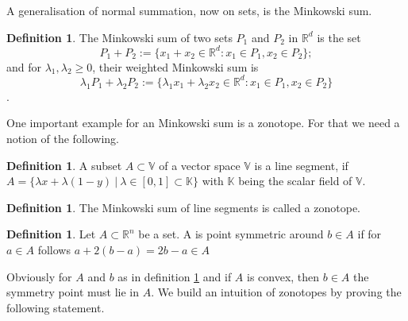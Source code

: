 \documentclass{article}
\theoremstyle{definition}
\newtheorem{definition}[theorem]{Definition}
\begin{document}
A generalisation of normal summation, now on sets, is the Minkowski sum.

\begin{definition}\cite[p.~4]{zhang2018tropical}
The Minkowski sum of two sets $P_1$ and $P_2$ in $\mathbb{R}^{d}$ is the set
$$ P_1 + P_2 := \{x_1 + x_2 \in \mathbb{R}^{d} : x_1 \in P_1 ,x_2 \in P_2 \};$$
and for $\lambda_1 , \lambda_2 \geq 0$, their weighted Minkowski sum is
$$ \lambda_1 P_1 + \lambda_2 P_2 := \{ \lambda_1 x_1 + \lambda_2 x_2 \in \mathbb{R}^{d} : x_1 \in P_1 , x_2 \in P_2 \} $$.
\end{definition}

One important example for an Minkowski sum is a zonotope. For that we need a notion of the following.
\begin{definition}
A subset $A \subset \mathbb{V}$ of a vector space $\mathbb{V}$ is a line segment, if $A=\{\lambda x + \lambda (1-y) \ | \ \lambda \in [0,1]\subset \mathbb{K}\}$ with $\mathbb{K}$ being the scalar field of $\mathbb{V}$.
\end{definition}

\begin{definition}
The Minkowski sum of line segments is called a zonotope.
\end{definition}

\begin{definition}
\label{def:point_sym}
Let $A \subset \mathbb{R}^{n}$ be a set. A is point symmetric around $b \in A$ if for $a \in A$ follows $a + 2(b-a)=2b-a \in A$
\end{definition}

Obviously for $A$ and $b$ as in definition \ref{def:point_sym} and if $A$ is convex, then $b \in A$ the symmetry point must lie in $A$. We build an intuition of zonotopes by proving the following statement.
\end{document}
